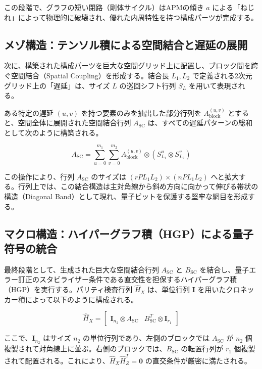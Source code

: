 \documentclass[12pt]{article}
\begin{document}
この段階で、グラフの短い閉路（剛体サイクル）はAPMの傾き $a$ による「ねじれ」によって物理的に破壊され、優れた内周特性を持つ構成パーツが完成する。

\subsection{メゾ構造：テンソル積による空間結合と遅延の展開}

次に、構築された構成パーツを巨大な空間グリッド上に配置し、ブロック間を跨ぐ空間結合（Spatial Coupling）を形成する。結合長 $L_1, L_2$ で定義される2次元グリッド上の「遅延」は、サイズ $L$ の巡回シフト行列 $S_L$ を用いて表現される。

ある特定の遅延 $(u, v)$ を持つ要素のみを抽出した部分行列を $A_{\text{block}}^{(u,v)}$ とすると、空間全体に展開された空間結合行列 $A_{\text{SC}}$ は、すべての遅延パターンの総和として次のように構築される。

\begin{equation}
    A_{\text{SC}} = \sum_{u=0}^{m_1} \sum_{v=0}^{m_2} A_{\text{block}}^{(u,v)} \otimes \left( S_{L_1}^u \otimes S_{L_2}^v \right)
\end{equation}

この操作により、行列 $A_{\text{SC}}$ のサイズは $(r P L_1 L_2) \times (n P L_1 L_2)$ へと拡大する。行列上では、この結合構造は主対角線から斜め方向に向かって伸びる帯状の構造（Diagonal Band）として現れ、量子ビットを保護する堅牢な網目を形成する。

\subsection{マクロ構造：ハイパーグラフ積（HGP）による量子符号の統合}

最終段階として、生成された巨大な空間結合行列 $A_{\text{SC}}$ と $B_{\text{SC}}$ を結合し、量子エラー訂正のスタビライザー条件である直交性を担保するハイパーグラフ積（HGP）を実行する。パリティ検査行列 $\hat{H}_X$ は、単位行列 $\mathbf{I}$ を用いたクロネッカー積によって以下のように構成される。

\begin{equation}
    \hat{H}_X = \begin{bmatrix} \mathbf{I}_{n_2} \otimes A_{\text{SC}} & B_{\text{SC}}^T \otimes \mathbf{I}_{r_1} \end{bmatrix}
\end{equation}

ここで、$\mathbf{I}_{n_2}$ はサイズ $n_2$ の単位行列であり、左側のブロックでは $A_{\text{SC}}$ が $n_2$ 個複製されて対角線上に並ぶ。右側のブロックでは、$B_{\text{SC}}$ の転置行列が $r_1$ 個複製されて配置される。これにより、$\hat{H}_X \hat{H}_Z^T = \mathbf{0}$ の直交条件が厳密に満たされる。
\end{document}

